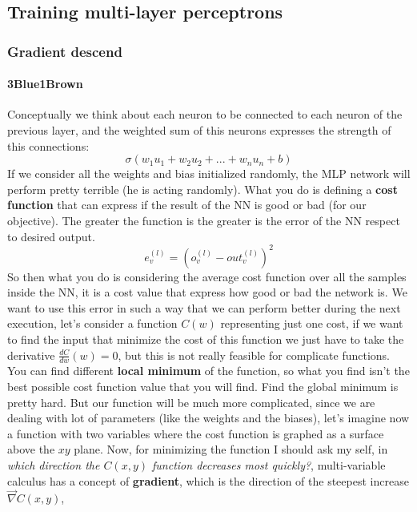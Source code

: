 \documentclass{article}
\begin{document}
\subsection{Training multi-layer perceptrons}
\subsubsection{Gradient descend}
\paragraph{3Blue1Brown}
Conceptually we think about each neuron to be connected to each neuron of the previous layer,
and the weighted sum of this neurons expresses the strength of this connections:
$$\sigma(w_1u_1+w_2u_2+...+w_nu_n+b)$$
If we consider all the weights and bias initialized randomly, the MLP network will perform
pretty terrible (he is acting randomly).
\newline\newline
What you do is defining a \textbf{cost function} that can express if the result of the NN
is good or bad (for our objective). The greater the function is the greater is the error of the
NN respect to desired output.
$$e_v^{(l)}=\left(o_v^{(l)}-out_v^{(l)}\right)^2$$
So then what you do is considering the average cost function over all the samples inside the
NN, it is a cost value that express how good or bad the network is.
\newline\newline
We want to use this error in such a way that we can perform better during the next execution,
let's consider a function $C(w)$ representing just one cost, if we want to find the input that
minimize the cost of this function we just have to take the derivative $\frac{dC}{dw}(w)=0$, but
this is not really feasible for complicate functions. You can find different \textbf{local minimum}
of the function, so what you find isn't the best possible cost function value that you will find.
Find the global minimum is pretty hard.
\newline\newline
But our function will be much more complicated, since we are dealing with lot of parameters (like
the weights and the biases), let's imagine now a function with two variables where the cost
function is graphed as a surface above the $xy$ plane. Now, for minimizing the function I should
ask my self, in \textit{which direction the $C(x,y)$ function decreases most quickly?}, multi-variable
calculus has a concept of \textbf{gradient}, which is the direction of the steepest increase $\vec{\nabla} C(x,y)$,
\end{document}
